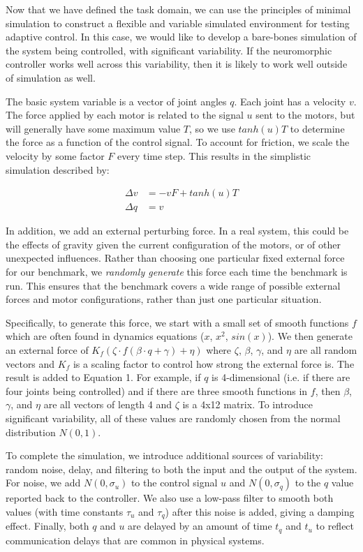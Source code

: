 \documentclass{frontiersSCNS} %
\begin{document}
Now that we have defined the task domain, we can use the principles of minimal
simulation to construct a flexible and variable simulated environment for
testing adaptive control.  In this case, we would like to develop a bare-bones simulation of
the system being controlled, with significant variability.  If the neuromorphic
controller works well across this variability, then it is likely to work well
outside of simulation as well.

The basic system variable is a vector of joint angles $q$.  
Each joint has a velocity $v$.  The force applied by each motor is 
related to the signal $u$ sent to the motors, but will generally have some
maximum value $T$, so we use $tanh(u)T$ to determine the force as a function of the control signal. To account for friction, we 
scale the velocity by some factor $F$ every time step.  
This results in the simplistic simulation described by:

\begin{align}
    \Delta v & =  -v F + tanh(u)T \\
    \Delta q & = v
\end{align}

In addition, we add an external perturbing force.  In a real system,
this could be the effects of gravity given the current configuration of the
motors, or of other unexpected influences.  
Rather than choosing one particular fixed external force for our benchmark,
we \emph{randomly generate} this force each time the benchmark is run.  This
ensures that the benchmark covers a wide range of possible external forces
and motor configurations, rather than just one particular situation.

Specifically, to generate this force, we start with a small set of
smooth functions $f$ which are often found in dynamics equations ($x$, $x^2$,
$sin(x)$).  We then generate an external force of $K_f (\zeta \cdot f(\beta \cdot q + \gamma) + \eta)$
where $\zeta$, $\beta$, $\gamma$, and $\eta$ are all random vectors and
$K_f$ is a scaling factor to control how strong the external force is.  The
result is added to Equation 1.  For example, if $q$ is 4-dimensional
(i.e. if there are four joints being controlled) and if there are three smooth
functions in $f$, then $\beta$, $\gamma$, and $\eta$ are 
all vectors of length 4 and $\zeta$ is a 4x12 matrix.  To introduce
significant variability, all of these values are
randomly chosen from the normal distribution $N(0,1)$.

To complete the simulation, we introduce additional sources of variability: random noise, delay, and filtering to both the input and the
output of the system.  For noise, we add $N(0,\sigma_u)$ to the control signal
$u$ and $N(0,\sigma_q)$ to the $q$ value reported back to the controller.  We
also use a low-pass filter to smooth both values (with time constants $\tau_u$
and $\tau_q$) after this noise is added, giving a damping effect.  Finally, both $q$ and $u$ are delayed
by an amount of time $t_q$ and $t_u$ to reflect communication delays that are
common in physical systems.
\end{document}
